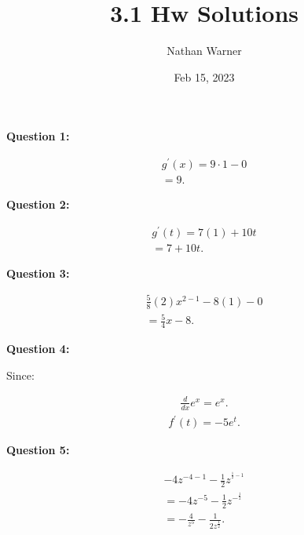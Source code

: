 \documentclass{report}
\title{\Huge{3.1 Hw Solutions}}
\author{\huge{Nathan Warner}}
\date{\huge{Feb 15, 2023}}
\begin{document}
    \maketitle
    \begin{Large}
        \noindent \textbf{Question 1:}
    \end{Large}
    \bigbreak \noindent 
    \bigbreak \noindent
    \begin{align*}
        g ^{\prime}(x) = 9 \cdot 1 - 0 \\ 
        = 9
    .\end{align*}

    \bigbreak \noindent \bigbreak \noindent 
    \begin{Large}
        \noindent \textbf{Question 2:}
    \end{Large}
    \bigbreak \noindent 
    \bigbreak \noindent 
    \begin{align*}
        g ^{\prime}(t) = 7(1) + 10t \\
        = 7 +10t
    .\end{align*}

    \bigbreak \noindent \bigbreak \noindent 
    \begin{Large}
        \noindent \textbf{Question 3:}
    \end{Large}
    \bigbreak \noindent 
    \bigbreak \noindent 
    \begin{align*}
        \frac{5}{8}(2)x^{2-1}-8(1)-0 \\
        = \frac{5}{4}x -8
    .\end{align*}

    \bigbreak \noindent \bigbreak \noindent 
    \begin{Large}
        \noindent \textbf{Question 4:}
    \end{Large}
    \bigbreak \noindent 
    \bigbreak \noindent 
    \begin{center}
        Since:
    \end{center}
    \begin{align*}
        \frac{d}{dx} e^x = e^x
    .\end{align*}
    \begin{align*}
        f ^{\prime}(t) = -5e^t
    .\end{align*}

    \bigbreak \noindent \bigbreak \noindent 
    \begin{Large}
        \noindent \textbf{Question 5:}
    \end{Large}
    \bigbreak \noindent 
    \bigbreak \noindent 
    \begin{align*}
        -4z^{-4-1} - \frac{1}{2}z^{^{ \frac{1}{2} - 1}} \\ 
        = -4z^{-5}- \frac{1}{2}z^{- ^{\frac{1}{2}}} \\ 
        = - \frac{4}{z^5} - \frac{1}{2z^{ \frac{1}{2}}}
    .\end{align*} 
\end{document}
